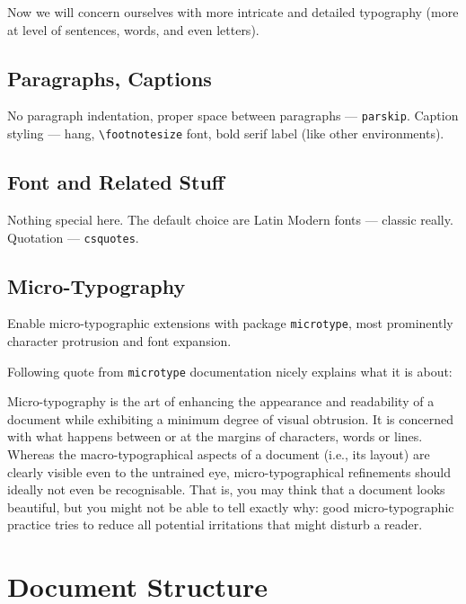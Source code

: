 Now we will concern ourselves with more intricate and detailed typography (more at level of sentences, words, and even letters).

\subsection{Paragraphs, Captions}%
\label{sub:Paragraphs}

No paragraph indentation, proper space between paragraphs --- \texttt{parskip}.
Caption styling --- hang, \verb|\footnotesize| font, bold serif label (like other environments).

\subsection{Font and Related Stuff}%
\label{sub:Font}

Nothing special here.
The default choice are Latin Modern fonts --- classic really.
Quotation --- \texttt{csquotes}.

\subsection{Micro-Typography}%
\label{sub:Micro-Typography}

Enable micro-typographic extensions with package \texttt{microtype}, most prominently character protrusion and font expansion.

Following quote from \texttt{microtype} documentation nicely explains what it is about:
\begin{displayquote}
    Micro-typography is the art of enhancing the appearance and readability of a
    document while exhibiting a minimum degree of visual obtrusion.
    It is concerned with what happens between or at the margins of characters, words or lines.
    Whereas the macro-typographical aspects of a document (i.e., its layout) are clearly visible even to the untrained eye, micro-typographical refinements should ideally not even be recognisable.
    That is, you may think that a document looks beautiful, but you might not be able to tell exactly why: good micro-typographic practice tries to reduce all potential irritations that might disturb a reader.
\end{displayquote}


\section{Document Structure}%
\label{sec:Document Structure}

